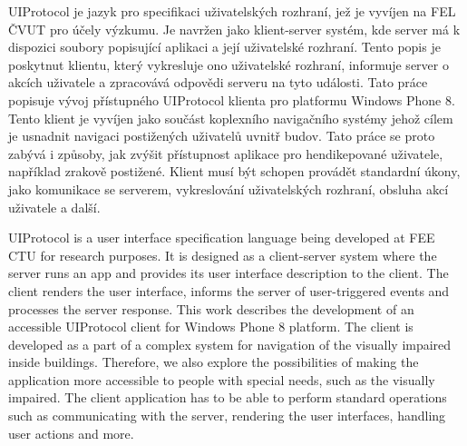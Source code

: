 \startAbstractCz
UIProtocol je jazyk pro specifikaci uživatelských rozhraní, jež je vyvíjen na FEL ČVUT pro účely výzkumu. Je navržen jako klient-server systém, kde server má k dispozici soubory popisující aplikaci a její uživatelské rozhraní. Tento popis je poskytnut klientu, který vykresluje ono uživatelské rozhraní, informuje server o akcích uživatele a zpracovává odpovědi serveru na tyto události. Tato práce popisuje vývoj přístupného UIProtocol klienta pro platformu Windows Phone 8. Tento klient je vyvíjen jako součást koplexního navigačního systémy jehož cílem je usnadnit navigaci postižených uživatelů uvnitř budov. Tato práce se proto zabývá i způsoby, jak zvýšit přístupnost aplikace pro hendikepované uživatele, například zrakově postižené. Klient musí být schopen provádět standardní úkony, jako komunikace se serverem, vykreslování uživatelských rozhraní, obsluha akcí uživatele a další.
\stopAbstractCz

\startAbstractEn
UIProtocol is a user interface specification language being developed at FEE CTU for research purposes. It is designed as a client-server system where the server runs an app and provides its user interface description to the client. The client renders the user interface, informs the server of user-triggered events and processes the server response. This work describes the development of an accessible UIProtocol client for Windows Phone 8 platform. The client is developed as a part of a complex system for navigation of the visually impaired inside buildings. Therefore, we also explore the possibilities of making the application more accessible to people with special needs, such as the visually impaired. The client application has to be able to perform standard operations such as communicating with the server, rendering the user interfaces, handling user actions and more.
\stopAbstractEn

\endinput
